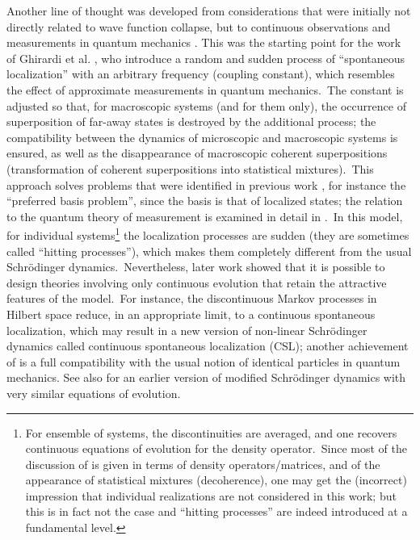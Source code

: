 \documentclass[12pt,onecolumn]{article}%
\begin{document}
Another line of thought was developed from considerations that were initially
not directly related to wave function collapse, but to continuous observations
and measurements in quantum mechanics \cite{BLP} \cite{Barchielli}. This was
the starting point for the work of Ghirardi et al. \cite{Ghirardi}, who
introduce a random and sudden process of ``spontaneous localization'' with an
arbitrary frequency (coupling constant), which resembles the effect of
approximate measurements in quantum mechanics.\ The constant is adjusted so
that, for macroscopic systems (and for them only), the occurrence of
superposition of far-away states is destroyed by the additional process; the
compatibility between the dynamics of microscopic and macroscopic systems is
ensured, as well as the disappearance of macroscopic coherent superpositions
(transformation of coherent superpositions into statistical mixtures).\ This
approach solves problems that were identified in previous work \cite{Pearle},
for instance the ``preferred basis problem'', since the basis is that of
localized states; the relation to the quantum theory of measurement is
examined in detail in \cite{BGRW}.\ In this model, for individual
systems\footnote{For ensemble of systems, the discontinuities are averaged,
and one recovers continuous equations of evolution for the density
operator.\ Since most of the discussion of \cite{Ghirardi} is given in terms
of density operators/matrices, and of the appearance of statistical mixtures
(decoherence), one may get the (incorrect) impression that individual
realizations are not considered in this work; but this is in fact not the case
and ``hitting processes'' are indeed introduced at a fundamental level.} the
localization processes are sudden (they are sometimes called ``hitting
processes''), which makes them completely different from the usual
Schr\"{o}dinger dynamics.\ Nevertheless, later work \cite{Pearle-5} showed
that it is possible to design theories involving only continuous evolution
that retain the attractive features of the model.\ For instance, the
discontinuous Markov processes in Hilbert space reduce, in an appropriate
limit, to a continuous spontaneous localization, which may result in a new
version of non-linear Schr\"{o}dinger dynamics \cite{GPR} called continuous
spontaneous localization (CSL); another achievement of \cite{GPR} is a full
compatibility with the usual notion of identical particles in quantum
mechanics. See also \cite{stochastic} for an earlier version of modified
Schr\"{o}dinger dynamics with very similar equations of evolution.
\end{document}
